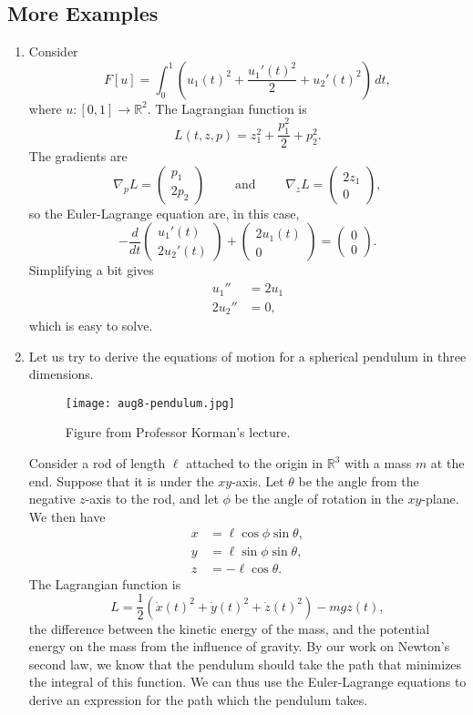 \documentclass[11pt]{article}
\newcommand{\R}{\mathbb{R}}
\begin{document}
\subsection{More Examples}

\begin{enumerate}
\item
Consider
\[
F[u] = \int_0^1 \left( u_1(t)^2 + \frac{u_1'(t)^2}{2} + u_2'(t)^2 \right) \, dt,
\]
where $u : [0, 1] \to \R^2$. The Lagrangian function is
\[
L(t,z,p) = z_1^2 + \frac{p_1^2}{2} + p_2^2.
\]
The gradients are
\[
\nabla_p L = \begin{pmatrix}
p_1 \\ 2p_2
\end{pmatrix} \qquad \text{ and } \qquad \nabla_z L = \begin{pmatrix}
2z_1 \\ 0
\end{pmatrix},
\]
so the Euler-Lagrange equation are, in this case,
\[
-\frac{d}{dt} \begin{pmatrix}
u_1'(t) \\
2u_2'(t)
\end{pmatrix} + \begin{pmatrix}
2u_1(t) \\ 0
\end{pmatrix} = \begin{pmatrix}
0 \\ 0
\end{pmatrix}.
\]
Simplifying a bit gives
\begin{align*}
u_1'' &= 2u_1 \\
2u_2'' &= 0,
\end{align*}
which is easy to solve.

\item
Let us try to derive the equations of motion for a spherical pendulum in three dimensions.

\begin{figure}[H]
\texttt{[image: aug8-pendulum.jpg]}
\centering
\caption{Figure from Professor Korman's lecture.}
\end{figure}

Consider a rod of length $\ell$ attached to the origin in $\R^3$ with a mass $m$ at the end. Suppose that it is under the $xy$-axis. Let $\theta$ be the angle from the negative $z$-axis to the rod, and let $\phi$ be the angle of rotation in the $xy$-plane. We then have
\begin{align*}
x &= \ell \cos \phi \sin \theta, \\
y  &= \ell \sin \phi \sin \theta, \\
z &= -\ell \cos \theta.
\end{align*}
The Lagrangian function is
\[
L = \frac{1}{2} \left( \dot{x}(t)^2 + \dot{y}(t)^2 + \dot{z}(t)^2 \right) - mgz(t),
\]
the difference between the kinetic energy of the mass, and the potential energy on the mass from the influence of gravity. By our work on Newton's second law, we know that the pendulum should take the path that minimizes the integral of this function. We can thus use the Euler-Lagrange equations to derive an expression for the path which the pendulum takes.


\end{enumerate}
\end{document}
